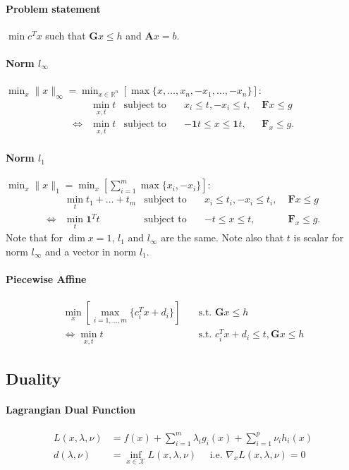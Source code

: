 \documentclass[landscape,a4paper,8pt]{scrartcl}
\renewcommand{\iff}{\Leftrightarrow}
\newcommand{\mc}[1]{\mathcal{#1}}
\newcommand{\R}{\mathbb R}
\newcommand\vA{\bm{A}}
\newcommand\vF{\bm{F}}
\newcommand\vG{\bm{G}}
\begin{document}
\begin{multicols*}{3}
\paragraph{Problem statement} $\min c^Tx$ such that $\vG x \leq h$ and $\vA x = b$.
\paragraph{Norm $l_\infty$}
$\min_x \lVert x \rVert_\infty = \min_{x \in \R^n} \left[ \max\{x,\dots,x_n,-x_1,\dots,-x_n\}\right]$:
\begin{align*}
     & \min_{x,t} t & \text{subject to}\quad & x_i \leq t, -x_i \leq t,   \; & \vF x \leq g \\
\iff & \min_{x,t} t & \text{subject to}\quad & -{\bm 1} t \leq x \leq {\bm 1} t,\; & \vF_x \leq g.
\end{align*}

\paragraph{Norm $l_1$}
$\min_x \lVert x \rVert_1 = \min_x\left[\sum_{i=1}^{m} \max\{x_i,-x_i\}\right]$:
\begin{align*}
     & \min_{t} t_1 + \dots + t_m & \text{subject to}\quad & x_i \leq t_i, -x_i \leq t_i,\; & \vF x \leq g \\
\iff & \min_{t} {\bm 1}^Tt    & \text{subject to}\quad & -t \leq x \leq t,\;            & \vF_x \leq g.
\end{align*}
Note that for $\dim x = 1$, $l_1$ and $l_\infty$ are the same.
Note also that $t$ is scalar for norm $l_\infty$ and a vector in norm $l_1$.

\paragraph{Piecewise Affine}
\begin{align*}
\min_x \left[ \max_{i=1,\dots,m} \{ c_i^Tx + d_i \} \right] & \quad \text{s.t.\ } \vG x \leq h \\
\iff \min_{x,t} t & \quad \text{s.t.\ } c_i^T x + d_i \leq t, \vG x \leq h
\end{align*}

\subsection{Duality}
\paragraph{Lagrangian Dual Function}
\begin{align*}
	L(x,\lambda,\nu) & = f(x) + \sum_{i=1}^{m}\lambda_i g_i(x) + \sum_{i=1}^{p}\nu_i h_i(x) \\
	d(\lambda,\nu) & = \inf_{x \in \mc{X}} L(x,\lambda,\nu) \quad \text{ i.e. } \nabla_x L(x, \lambda, \nu) = 0
\end{align*}

\end{multicols*}
\end{document}
